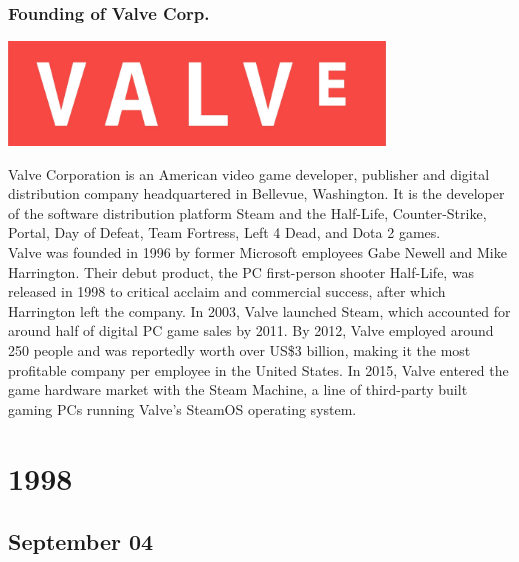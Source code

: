 \documentclass[11pt]{report}
\begin{document}
\subsection{Founding of Valve Corp.}
\vspace{2mm}\begin{center}\includegraphics[width=10cm]{./img/valveLogo.jpg}\end{center}
Valve Corporation is an American video game developer, publisher and digital distribution company headquartered in Bellevue, Washington. It is the developer of the software distribution platform Steam and the Half-Life, Counter-Strike, Portal, Day of Defeat, Team Fortress, Left 4 Dead, and Dota 2 games.\\
\indent Valve was founded in 1996 by former Microsoft employees Gabe Newell and Mike Harrington. Their debut product, the PC first-person shooter Half-Life, was released in 1998 to critical acclaim and commercial success, after which Harrington left the company. In 2003, Valve launched Steam, which accounted for around half of digital PC game sales by 2011. By 2012, Valve employed around 250 people and was reportedly worth over US\$3 billion, making it the most profitable company per employee in the United States. In 2015, Valve entered the game hardware market with the Steam Machine, a line of third-party built gaming PCs running Valve's SteamOS operating system.

\chapter{1998}
\section{September 04}
\end{document}
